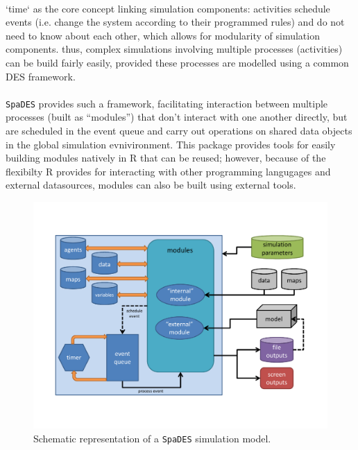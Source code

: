 \documentclass{article}
\begin{document}
\paragraph{}
`time` as the core concept linking simulation components: activities schedule events (i.e. change the system according to their programmed rules) and do not need to know about each other, which allows for modularity of simulation components. thus, complex simulations involving multiple processes (activities) can be build fairly easily, provided these processes are modelled using a common DES framework.

\paragraph{}
\texttt{SpaDES} provides such a framework, facilitating interaction between multiple processes (built as ``modules'') that don't interact with one another directly, but are scheduled in the event queue and carry out operations on shared data objects in the global simulation evnivironment. This package provides tools for easily building modules natively in \textsf{R} that can be reused; however, because of the flexibilty R provides for interacting with other programming langugages and external datasources, modules can also be built using external tools.

\begin{figure}[!htbp]
  \centering
	\includegraphics[width=5in]{../inst/SpaDES-overview-diagram.pdf}
	\caption{Schematic representation of a \texttt{SpaDES} simulation model.}
	\label{figure-SpaDES-overview}
\end{figure}
\end{document}
